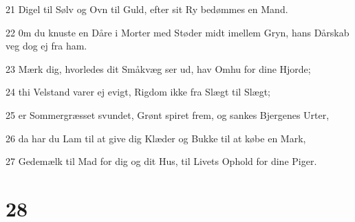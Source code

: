 \par 21 Digel til Sølv og Ovn til Guld, efter sit Ry bedømmes en Mand.
\par 22 0m du knuste en Dåre i Morter med Støder midt imellem Gryn, hans Dårskab veg dog ej fra ham.
\par 23 Mærk dig, hvorledes dit Småkvæg ser ud, hav Omhu for dine Hjorde;
\par 24 thi Velstand varer ej evigt, Rigdom ikke fra Slægt til Slægt;
\par 25 er Sommergræsset svundet, Grønt spiret frem, og sankes Bjergenes Urter,
\par 26 da har du Lam til at give dig Klæder og Bukke til at købe en Mark,
\par 27 Gedemælk til Mad for dig og dit Hus, til Livets Ophold for dine Piger.

\chapter{28}

